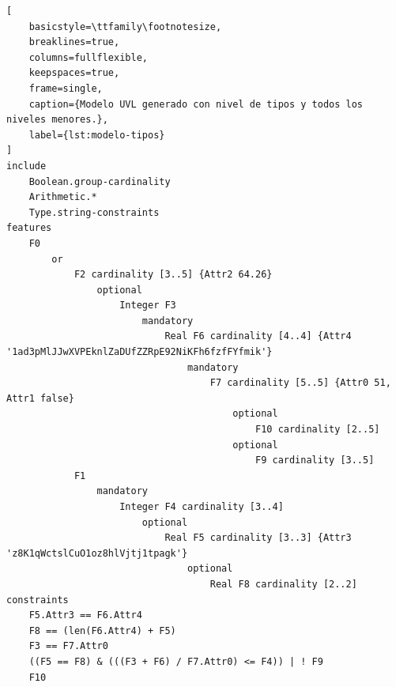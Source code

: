 \begin{lstlisting}[
    basicstyle=\ttfamily\footnotesize,
    breaklines=true,
    columns=fullflexible,
    keepspaces=true,
    frame=single,
    caption={Modelo UVL generado con nivel de tipos y todos los niveles menores.},
    label={lst:modelo-tipos}
]
include
    Boolean.group-cardinality
    Arithmetic.*
    Type.string-constraints
features
    F0
        or
            F2 cardinality [3..5] {Attr2 64.26}
                optional
                    Integer F3
                        mandatory
                            Real F6 cardinality [4..4] {Attr4 '1ad3pMlJJwXVPEknlZaDUfZZRpE92NiKFh6fzfFYfmik'}
                                mandatory
                                    F7 cardinality [5..5] {Attr0 51, Attr1 false}
                                        optional
                                            F10 cardinality [2..5]
                                        optional
                                            F9 cardinality [3..5]
            F1
                mandatory
                    Integer F4 cardinality [3..4]
                        optional
                            Real F5 cardinality [3..3] {Attr3 'z8K1qWctslCuO1oz8hlVjtj1tpagk'}
                                optional
                                    Real F8 cardinality [2..2]
constraints
    F5.Attr3 == F6.Attr4
    F8 == (len(F6.Attr4) + F5)
    F3 == F7.Attr0
    ((F5 == F8) & (((F3 + F6) / F7.Attr0) <= F4)) | ! F9
    F10
\end{lstlisting}

